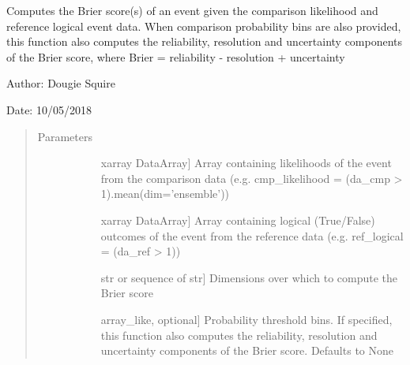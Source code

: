 \documentclass[letterpaper,10pt,english]{sphinxmanual}
\begin{document}

\begin{fulllineitems}
\label{\detokenize{skill_doc:skill.Brier_score}}
Computes the Brier score(s) of an event given the comparison likelihood and reference logical                 event data. When comparison probability bins are also provided, this function also computes                 the reliability, resolution and uncertainty components of the Brier score, where Brier =                 reliability - resolution + uncertainty

\begin{DUlineblock}{0em}
\item[] Author: Dougie Squire
\item[] Date: 10/05/2018
\end{DUlineblock}
\begin{quote}\begin{description}
\item[{Parameters}] \leavevmode\begin{description}
\item[{}] \leavevmode{[}xarray DataArray{]}
Array containing likelihoods of the event from the comparison data (e.g. cmp\_likelihood =                     (da\_cmp \textgreater{} 1).mean(dim=’ensemble’))

\item[{}] \leavevmode{[}xarray DataArray{]}
Array containing logical (True/False) outcomes of the event from the reference data (e.g.                    ref\_logical = (da\_ref \textgreater{} 1))

\item[{}] \leavevmode{[}str or sequence of str{]}
Dimensions over which to compute the Brier score

\item[{}] \leavevmode{[}array\_like, optional{]}
Probability threshold bins. If specified, this function also computes the reliability,                     resolution and uncertainty components of the Brier score. Defaults to None

\end{description}


\end{description}
\end{quote}
\end{fulllineitems}
\end{document}
